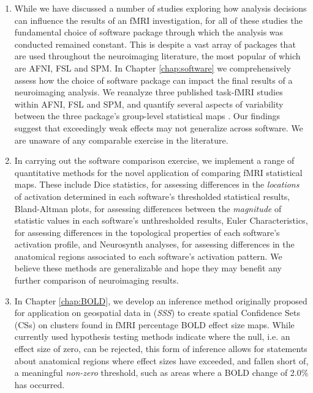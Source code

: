 \begin{enumerate}

\item While we have discussed a number of studies exploring how analysis decisions can influence the results of an fMRI investigation, for all of these studies the fundamental choice of software package through which the analysis was conducted remained constant. This is despite a vast array of packages that are used throughout the neuroimaging literature, the most popular of which are AFNI, FSL and SPM. In Chapter \ref{chap:software} we comprehensively assess how the choice of software package can impact the final results of a neuroimaging analysis. We reanalyze three published task-fMRI studies within AFNI, FSL and SPM, and quantify several aspects of variability between the three package's group-level statistical maps \citep{Bowring2019-fc}. Our findings suggest that exceedingly weak effects may not generalize across software. We are unaware of any comparable exercise in the literature.  

\item In carrying out the software comparison exercise, we implement a range of quantitative methods for the novel application of comparing fMRI statistical maps. These include Dice statistics, for assessing differences in the \textit{locations} of activation determined in each software's thresholded statistical results, Bland-Altman plots, for assessing differences between the \textit{magnitude} of statistic values in each software's unthresholded results, Euler Characteristics, for assessing differences in the topological properties of each software's activation profile, and Neurosynth analyses, for assessing differences in the anatomical regions associated to each software's activation pattern. We believe these methods are generalizable and hope they may benefit any further comparison of neuroimaging results. 

\item In Chapter \ref{chap:BOLD}, we develop an inference method originally proposed for application on geospatial data in \citet*{Sommerfeld2018-zl} (\textit{SSS}) to create spatial Confidence Sets (CSs) on clusters found in fMRI percentage BOLD effect size maps. While currently used hypothesis testing methods indicate where the null, i.e. an effect size of zero, can be rejected, this form of inference allows for statements about anatomical regions where effect sizes have exceeded, and fallen short of, a meaningful \textit{non-zero} threshold, such as areas where a BOLD change of 2.0\% has occurred. 


\end{enumerate}
